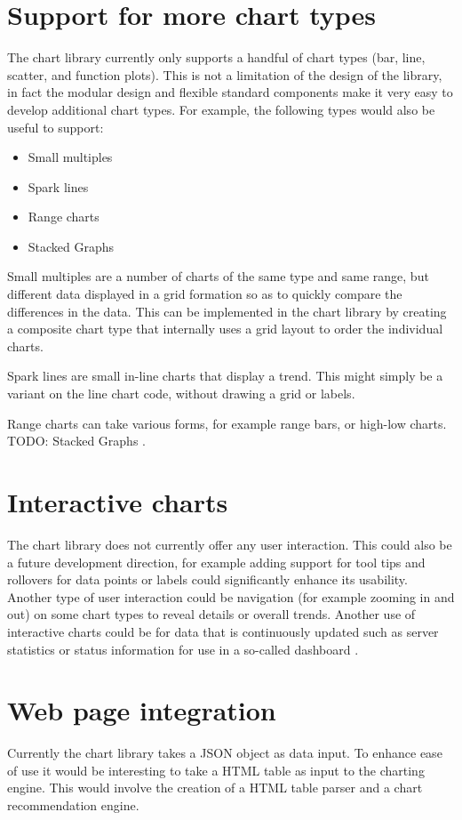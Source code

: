 \section{Support for more chart types}
The chart library currently only supports a handful of chart types (bar, line, scatter, and function plots). This is not a limitation of the design of the library, in fact the modular design and flexible standard components make it very easy to develop additional chart types. For example, the following types would also be useful to support:
\begin{itemize}
\item Small multiples
\item Spark lines
\item Range charts
\item Stacked Graphs
\end{itemize}

Small multiples\cite{tufte01} are a number of charts of the same type and same range, but different data displayed in a grid formation so as to quickly compare the differences in the data. This can be implemented in the chart library by creating a composite chart type that internally uses a grid layout to order the individual charts. 

Spark lines\cite{tufte06} are small in-line charts that display a trend. This might simply be a variant on the line chart code, without drawing a grid or labels.

Range charts can take various forms, for example range bars, or high-low charts. 
TODO: Stacked Graphs \cite{byron08}.


\section{Interactive charts}
The chart library does not currently offer any user interaction. This could also be a future development direction, for example adding support for tool tips and rollovers for data points or labels could significantly enhance its usability. Another type of user interaction could be navigation (for example zooming in and out) on some chart types to reveal details or overall trends. Another use of interactive charts could be for data that is continuously updated such as server statistics or status information for use in a so-called dashboard \cite{few06}.

\section{Web page integration}
Currently the chart library takes a JSON object as data input. To enhance ease of use it would be interesting to take a HTML table as input to the charting engine. This would involve the creation of a HTML table parser and a chart recommendation engine. 

